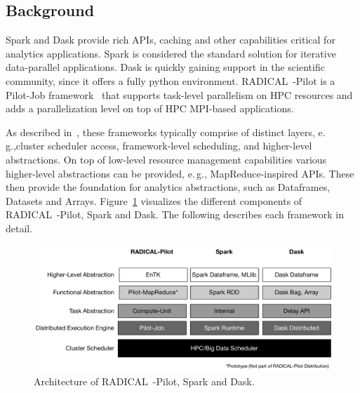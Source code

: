 \subsection{Background}
Spark and Dask provide rich APIs, caching and other capabilities critical for analytics applications.
Spark is considered the standard solution for iterative data-parallel applications.
Dask is quickly gaining support in the scientific community, since it offers a fully python environment.
RADICAL~-Pilot is a Pilot-Job framework~\cite{luckow2012pstar} that supports task-level parallelism on HPC resources and adds a parallelization level on top of HPC MPI-based applications.

As described in~\cite{jha2014tale}, these frameworks typically comprise of distinct layers, e.\,g.,cluster scheduler access, framework-level scheduling, and higher-level abstractions.
On top of low-level resource management capabilities various higher-level abstractions can be provided, e.\,g., MapReduce-inspired APIs.
These then provide the foundation for analytics abstractions, such as Dataframes, Datasets and Arrays.
Figure~\ref{fig:figures_bigdata_framework_stack} visualizes the different components of RADICAL~-Pilot, Spark and Dask.
The following describes each framework in detail.

\begin{figure}[ht]
    \centering
    \includegraphics[width=.95\textwidth]{figures/data_analytics_hpc/task_par/bigdata_framework_stack.pdf}
    \caption{Architecture of RADICAL~-Pilot, Spark and Dask.}
    \label{fig:figures_bigdata_framework_stack}
\end{figure}

